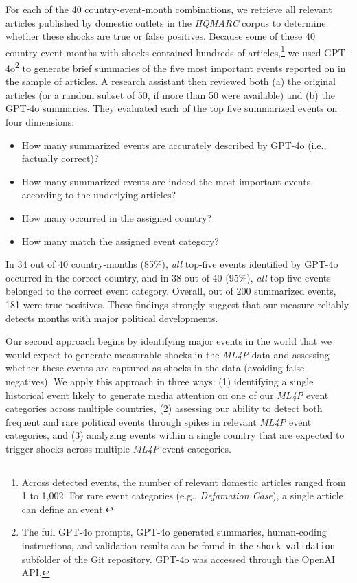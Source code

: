 \documentclass[
  letterpaper,
  DIV=11,
  numbers=noendperiod]{scrartcl}
\providecommand{\tightlist}{%
  \setlength{\itemsep}{0pt}\setlength{\parskip}{0pt}}\usepackage{longtable,booktabs,array}
\begin{document}
For each of the 40 country-event-month combinations, we retrieve all
relevant articles published by domestic outlets in the \emph{HQMARC}
corpus to determine whether these shocks are true or false positives.
Because some of these 40 country-event-months with shocks contained
hundreds of articles,\footnote{Across detected events, the number of
  relevant domestic articles ranged from 1 to 1,002. For rare event
  categories (e.g., \emph{Defamation Case}), a single article can define
  an event.} we used GPT-4o\footnote{The full GPT-4o prompts, GPT-4o
  generated summaries, human-coding instructions, and validation results
  can be found in the \texttt{shock-validation} subfolder of the Git
  repository. GPT-4o was accessed through the OpenAI API.} to generate
brief summaries of the five most important events reported on in the
sample of articles. A research assistant then reviewed both (a) the
original articles (or a random subset of 50, if more than 50 were
available) and (b) the GPT-4o summaries. They evaluated each of the top
five summarized events on four dimensions:

\begin{itemize}
\tightlist
\item
  How many summarized events are accurately described by GPT-4o (i.e.,
  factually correct)?
\item
  How many summarized events are indeed the most important events,
  according to the underlying articles?
\item
  How many occurred in the assigned country?
\item
  How many match the assigned event category?
\end{itemize}

In 34 out of 40 country-months (85\%), \emph{all} top-five events
identified by GPT-4o occurred in the correct country, and in 38 out of
40 (95\%), \emph{all} top-five events belonged to the correct event
category. Overall, out of 200 summarized events, 181 were true
positives. These findings strongly suggest that our measure reliably
detects months with major political developments.

Our second approach begins by identifying major events in the world that
we would expect to generate measurable shocks in the \emph{ML4P} data
and assessing whether these events are captured as shocks in the data
(avoiding false negatives). We apply this approach in three ways: (1)
identifying a single historical event likely to generate media attention
on one of our \emph{ML4P} event categories across multiple countries,
(2) assessing our ability to detect both frequent and rare political
events through spikes in relevant \emph{ML4P} event categories, and (3)
analyzing events within a single country that are expected to trigger
shocks across multiple \emph{ML4P} event categories.
\end{document}
